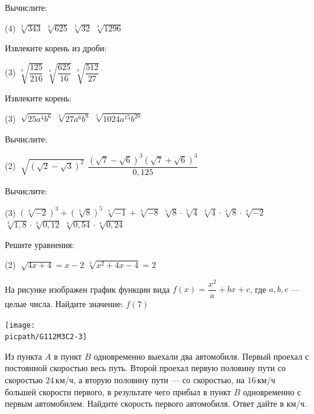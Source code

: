 \begin{homework}[number=1]
	\begin{listofex}
		\item Вычислите:
		\begin{tasks}(4)
			\task \( \sqrt[3]{343} \)
			\task \( \sqrt[4]{625} \)
			\task \( \sqrt[5]{32} \)
			\task \( \sqrt[4]{1296} \)
		\end{tasks}
		\item Извлеките корень из дроби:
		\begin{tasks}(3)
			\task \( \sqrt[3]{\dfrac{125}{216}} \)
			\task \( \sqrt[4]{\dfrac{625}{16}} \)
			\task \( \sqrt[3]{\dfrac{512}{27}} \)
		\end{tasks}
		\item Извлеките корень:
		\begin{tasks}(3)
			\task \( \sqrt[]{ 25a^4b^6 } \)
			\task \( \sqrt[3]{ 27a^6b^9 } \)
			\task \( \sqrt[5]{ 1024a^{15}b^{20} } \)
		\end{tasks}
		\item Вычислите:
		\begin{tasks}(2)
			\task \( \sqrt[]{(\sqrt{2}-\sqrt{3})^2} \)
			\task \( \dfrac{(\sqrt{7}-\sqrt{6})^3(\sqrt{7}+\sqrt{6})^3}{0,125} \)
		\end{tasks}
		\item Вычислите:
		\begin{tasks}(3)
			\task \( (\sqrt[3]{-2})^3 + (\sqrt[5]{8})^5 \)
			\task \( \sqrt[5]{-1} + \sqrt[3]{-8} \)
			\task \( \sqrt[5]{8} \cdot \sqrt[5]{4} \)
			\task \( \sqrt[3]{4} \cdot \sqrt[3]{8} \cdot \sqrt[3]{-2} \)
			\task \( \sqrt[3]{1,8} \cdot \sqrt[3]{0,12} \)
			\task \( \sqrt[4]{0,54} \cdot \sqrt[4]{0,24} \)
		\end{tasks}
		\item Решите уравнения:
		\begin{tasks}(2)
			\task \( \sqrt[]{4x+4} = x-2 \)
			\task \( \sqrt[3]{x^2+4x-4}=2 \)
		\end{tasks}
		\item 
		\begin{minipage}[t]{\bodywidth}
			На рисунке изображен график функции вида \( f(x)=\dfrac{x^2}{a}+bx+c \), где \( a, b, c \) --- целые числа. Найдите значение: \( f(7) \)
		\end{minipage}
		\hspace{0.02\linewidth}
		\begin{minipage}[t]{\picwidth}
			\texttt{[image: \\picpath/G112M3C2-3]}
		\end{minipage}
		\item Из пункта \(A\) в пункт \(B\) одновременно выехали два автомобиля. Первый проехал с постоянной скоростью весь путь. Второй проехал первую половину пути со скоростью \(24\) км/ч, а вторую половину пути --- со скоростью, на \(16\) км/ч большей скорости первого, в результате чего прибыл в пункт \(B\) одновременно с первым автомобилем. Найдите скорость первого автомобиля. Ответ дайте в км/ч.
	\end{listofex}
\end{homework}

